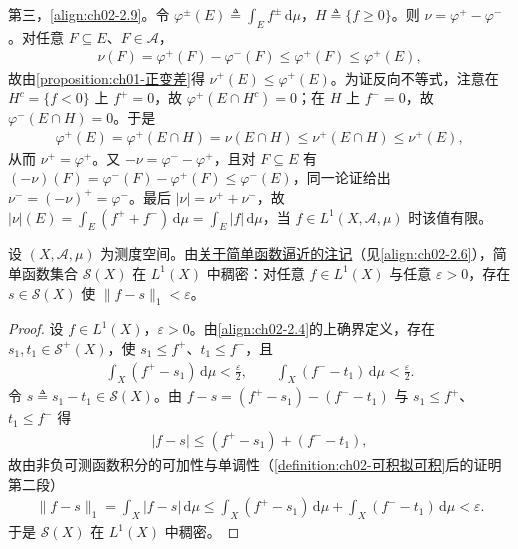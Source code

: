 \documentclass[../../main.tex]{subfiles}%
\begin{document}
\begin{remark}
第三，\eqref{align:ch02-2.9}。令 $\varphi^\pm(E)\triangleq\int_Ef^\pm\,\mathrm{d}\mu$，$H\triangleq\{f\geqslant0\}$。则 $\nu=\varphi^+-\varphi^-$。对任意 $F\subseteq E$、$F\in\mathscr A$，
\begin{align*}
\nu(F)=\varphi^+(F)-\varphi^-(F)\leqslant\varphi^+(F)\leqslant\varphi^+(E),
\end{align*}
故由\cref{proposition:ch01-正变差}得 $\nu^+(E)\leqslant\varphi^+(E)$。为证反向不等式，注意在 $H^c=\{f<0\}$ 上 $f^+=0$，故 $\varphi^+(E\cap H^c)=0$；在 $H$ 上 $f^-=0$，故 $\varphi^-(E\cap H)=0$。于是
\begin{align*}
\varphi^+(E)=\varphi^+(E\cap H)=\nu(E\cap H)\leqslant\nu^+(E\cap H)\leqslant\nu^+(E),
\end{align*}
从而 $\nu^+=\varphi^+$。又 $-\nu=\varphi^--\varphi^+$，且对 $F\subseteq E$ 有 $(-\nu)(F)=\varphi^-(F)-\varphi^+(F)\leqslant\varphi^-(E)$，同一论证给出 $\nu^-=(-\nu)^+=\varphi^-$。最后 $|\nu|=\nu^++\nu^-$，故 $|\nu|(E)=\int_E(f^++f^-)\,\mathrm{d}\mu=\int_E|f|\,\mathrm{d}\mu$，当 $f\in L^1(X,\mathscr A,\mu)$ 时该值有限。
\end{remark}

\begin{remark}\label{remark:ch02-简单函数稠密}
设 $(X,\mathscr A,\mu)$ 为测度空间。由\hyperref[remark:ch02-简单逼近积分]{关于简单函数逼近的注记}（见\eqref{align:ch02-2.6}），简单函数集合 $\mathscr S(X)$ 在 $L^1(X)$ 中稠密：对任意 $f\in L^1(X)$ 与任意 $\varepsilon>0$，存在 $s\in\mathscr S(X)$ 使 $\|f-s\|_1<\varepsilon$。
\end{remark}

\begin{proof}
设 $f\in L^1(X)$，$\varepsilon>0$。由\eqref{align:ch02-2.4}的上确界定义，存在 $s_1,t_1\in\mathscr S^+(X)$，使 $s_1\leqslant f^+$、$t_1\leqslant f^-$，且
\begin{align*}
\int_X(f^+-s_1)\,\mathrm{d}\mu<\frac{\varepsilon}2,\qquad\int_X(f^--t_1)\,\mathrm{d}\mu<\frac{\varepsilon}2.
\end{align*}
令 $s\triangleq s_1-t_1\in\mathscr S(X)$。由 $f-s=(f^+-s_1)-(f^- -t_1)$ 与 $s_1\leqslant f^+$、$t_1\leqslant f^-$ 得
\begin{align*}
|f-s|\leqslant(f^+-s_1)+(f^--t_1),
\end{align*}
故由非负可测函数积分的可加性与单调性（\cref{definition:ch02-可积拟可积}后的证明第二段）
\begin{align*}
\|f-s\|_1=\int_X|f-s|\,\mathrm{d}\mu\leqslant\int_X(f^+-s_1)\,\mathrm{d}\mu+\int_X(f^--t_1)\,\mathrm{d}\mu<\varepsilon.
\end{align*}
于是 $\mathscr S(X)$ 在 $L^1(X)$ 中稠密。
\end{proof}
\end{document}
